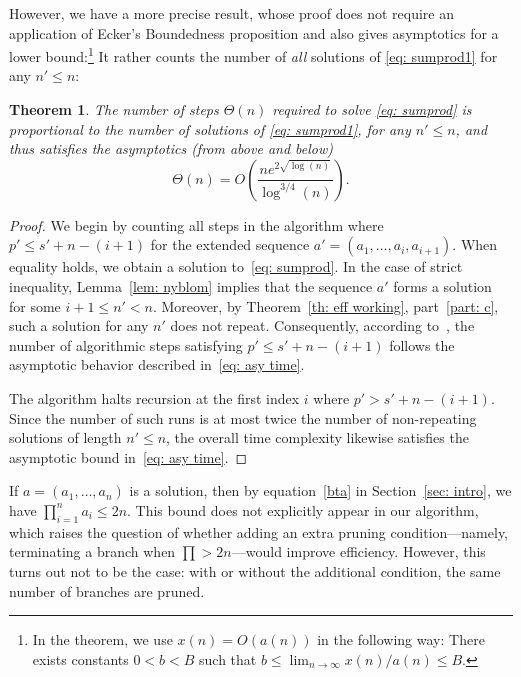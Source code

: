 \documentclass[10pt]{article}
\newtheorem{theorem}{Theorem}
\theoremstyle{definition}
\theoremstyle{remark}
\numberwithin{equation}{section}
\begin{document}
However, we have a more precise result, whose proof does not require an application of  Ecker's Boundedness proposition and also gives asymptotics for a lower bound:\footnote{In the theorem, we use $x(n)=O(a(n))$ in the following way: There exists constants $0<b<B$ such that $b\leq \lim_{n\rightarrow \infty} x(n)/a(n)\leq B$.} It rather counts the number of {\it all} solutions of \eqref{eq: sumprod1} for any $n'\leq n$:
\begin{theorem}\label{thm: complexity}
The number of steps \( \Theta(n) \) required to solve \eqref{eq: sumprod} is proportional to the number of solutions of \eqref{eq: sumprod1}, for any $n'\leq n$, and thus satisfies the asymptotics (from above and below)
\begin{equation}\label{eq: asy time}
\Theta(n) = O\left(\frac{n e^{2\sqrt{\log(n)}}}{\log^{3/4}(n)}\right).
\end{equation}
\end{theorem}

\begin{proof}
We begin by counting all steps in the algorithm where \( p' \leq s' + n - (i + 1) \) for the extended sequence \( a' = (a_1, \dots, a_i, a_{i+1}) \). When equality holds, we obtain a solution to~\eqref{eq: sumprod}. In the case of strict inequality, Lemma~\ref{lem: nyblom} implies that the sequence \( a' \) forms a solution for some \( i+1 \leq n' < n \). Moreover, by Theorem~\ref{th: eff working}, part~\ref{part: c}, such a solution for any \( n' \) does not repeat. Consequently, according to~\cite{weingartner}, the number of algorithmic steps satisfying  
\( p' \leq s' + n - (i + 1) \) follows the asymptotic behavior described in~\eqref{eq: asy time}.

The algorithm halts recursion at the first index \( i \) where  \( p' > s' + n - (i + 1) \). Since the number of such runs is at most twice the number of non-repeating solutions of length \( n' \leq n \), the overall time complexity likewise satisfies the asymptotic bound in~\eqref{eq: asy time}.
\end{proof}





If \( a = (a_1, \dots, a_n) \) is a solution, then by equation~\eqref{bta} in Section~\ref{sec: intro}, we have \( \prod_{i=1}^n a_i \leq 2n \). This bound does not explicitly appear in our algorithm, which raises the question of whether adding an extra pruning condition—namely, terminating a branch when \( \prod > 2n \)—would improve efficiency. However, this turns out not to be the case: with or without the additional condition, the same number of branches are pruned.
\end{document}
